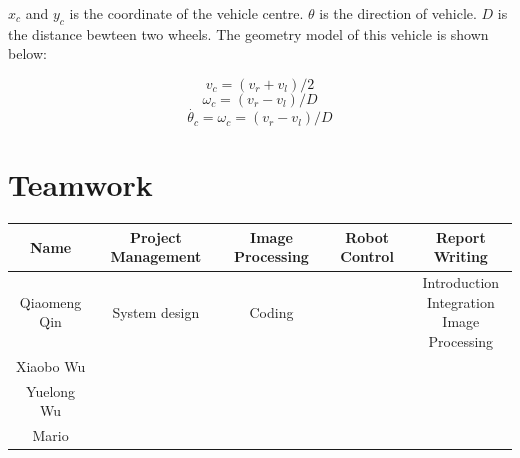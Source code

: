 $x_c$ and $y_c$ is the coordinate of the vehicle centre. $\theta$ is the direction of vehicle. $D$ is the distance bewteen two wheels. The geometry model of this vehicle is shown below:

$$ v_c = (v_r+v_l)/2 $$
$$ \omega_c = ( v_r - v_l ) / D $$
$$ \dot{\theta_c} = \omega_c = ( v_r - v_l ) / D $$

\section{Teamwork}

\begin{table}[h]\footnotesize
\begin{tabular}{c|cccc}
\hline 
Name&Project Management&Image Processing&Robot Control&Report Writing\\
\hline 
Qiaomeng Qin&System design&Coding&& \makecell[c]{Introduction\\Integration\\Image Processing} \\
Xiaobo Wu&\\
Yuelong Wu&\\
Mario &\\
\hline 
\end{tabular}
\end{table}


